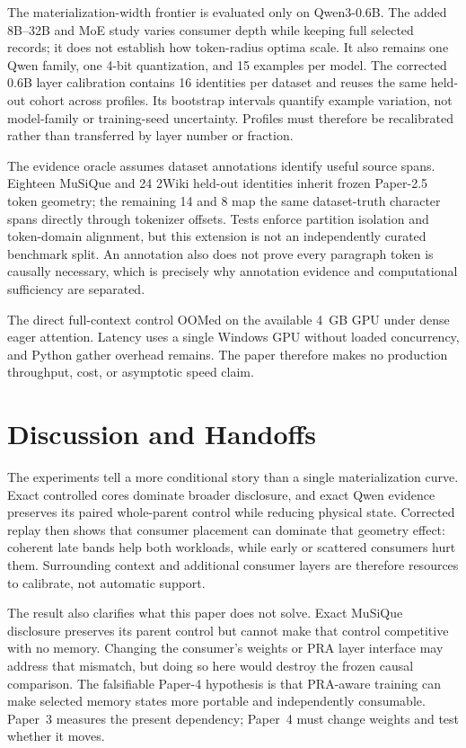 \documentclass[11pt]{article}
\begin{document}
The materialization-width frontier is evaluated only on Qwen3-0.6B. The added
8B--32B and MoE study varies consumer depth while keeping full selected records;
it does not establish how token-radius optima scale. It also remains one Qwen
family, one 4-bit quantization, and 15 examples per model. The corrected 0.6B
layer calibration contains 16 identities per dataset and reuses the same
held-out cohort across profiles. Its bootstrap intervals quantify example
variation, not model-family or training-seed uncertainty. Profiles must
therefore be recalibrated rather than transferred by layer number or fraction.

The evidence oracle assumes dataset annotations identify useful source spans.  Eighteen MuSiQue
and 24 2Wiki held-out identities inherit frozen Paper-2.5 token geometry; the remaining 14 and 8
map the same dataset-truth character spans directly through tokenizer offsets.  Tests enforce
partition isolation and token-domain alignment, but this extension is not an independently
curated benchmark split.  An annotation also does not prove every paragraph token is causally
necessary, which is precisely why annotation evidence and computational sufficiency are separated.

The direct full-context control OOMed on the available 4~GB GPU under dense eager attention.
Latency uses a single Windows GPU without loaded concurrency, and Python gather overhead remains.
The paper therefore makes no production throughput, cost, or asymptotic speed claim.

\section{Discussion and Handoffs}

The experiments tell a more conditional story than a single materialization curve.  Exact
controlled cores dominate broader disclosure, and exact Qwen evidence preserves its paired
whole-parent control while reducing physical state.  Corrected replay then shows that consumer
placement can dominate that geometry effect: coherent late bands help both workloads, while early
or scattered consumers hurt them.  Surrounding context and additional consumer layers are
therefore resources to calibrate, not automatic support.

The result also clarifies what this paper does not solve.  Exact MuSiQue disclosure preserves its
parent control but cannot make that control competitive with no memory.  Changing the consumer's
weights or PRA layer interface may address that mismatch, but doing so here would destroy the
frozen causal comparison.  The falsifiable Paper-4 hypothesis is that PRA-aware training can make
selected memory states more portable and independently consumable.  Paper~3 measures the present
dependency; Paper~4 must change weights and test whether it moves.
\end{document}
